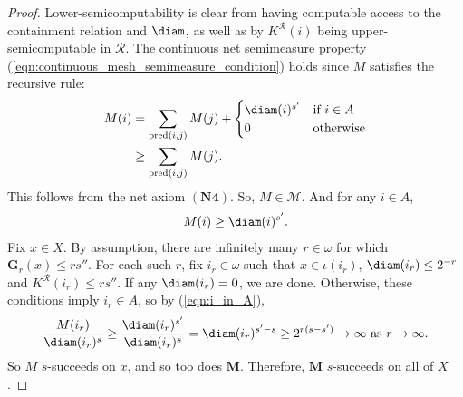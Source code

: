 \begin{proof}
    Lower-semicomputability is clear from having computable access to the containment relation and $\diam$, as well as by $K^{\mathscr{R}}(i)$ being upper-semicomputable in $\mathscr{R}$. The continuous net semimeasure property (\ref{eqn:continuous_mesh_semimeasure_condition}) holds since $M$ satisfies the recursive rule:
    \begin{align*}
        M(i) &= \sum_{\operatorname{pred}(i, j)} M(j) + \begin{cases}  \diam(i)^{s'} & \text{if } i \in A \\ 0 & \text{otherwise} \end{cases}\\
        &\geq \sum_{\operatorname{pred}(i, j)} M(j).
    \end{align*}
    This follows from the net axiom $(\mathbf{N4})$.
    So, $M \in \mathcal{M}$. And for any $i \in A$, 
    \begin{align}
        M(i) \geq \diam(i)^{s'}.
        \label{eqn:i_in_A}
    \end{align}
    Fix $x \in X$. By assumption, there are infinitely many $r \in \omega$ for which $\mathbf{G}_r(x) \leq r s''$. For each such $r$, fix $i_r \in \omega$ such that $x \in \iota(i_r)$, $\diam(i_r) \leq 2^{-r}$ and $K^{\mathscr{R}}(i_r) \leq r s''$. If any $\diam(i_r) = 0$, we are done. Otherwise, these conditions imply $i_r \in A$, so by (\ref{eqn:i_in_A}),
    \begin{align*}
        \frac{M(i_r)}{\diam(i_r)^s} \geq \frac{\diam(i_r)^{s'}}{\diam(i_r)^s} = \diam(i_r)^{s' - s} \geq 2^{r(s - s')} \to \infty \text{ as } r \to \infty.
    \end{align*}
    So $M$ $s$-succeeds on $x$, and so too does $\mathbf{M}$. Therefore, $\mathbf{M}$ $s$-succeeds on all of $X$.     
\end{proof}

